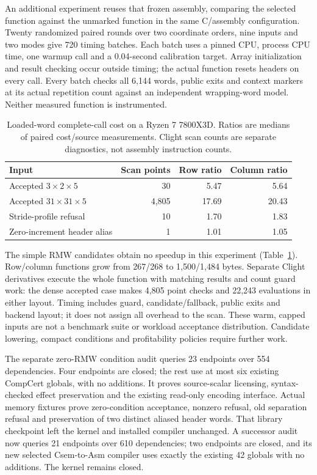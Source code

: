 An additional experiment reuses that frozen assembly, comparing the
selected function against the unmarked function in the same C/assembly
configuration. Twenty randomized paired rounds over two coordinate orders,
nine inputs and two modes give 720 timing batches. Each batch uses a pinned
CPU, process CPU time, one warmup call and a 0.04-second calibration target.
Array initialization and result checking occur outside timing; the actual
function resets headers on every call. Every batch checks all 6,144 words,
public exits and context markers at its actual repetition count against an
independent wrapping-word model. Neither measured function is instrumented.

\begin{table}[t]
\centering
\caption{Loaded-word complete-call cost on a Ryzen 7 7800X3D. Ratios are
medians of paired cost/source measurements. Clight scan counts are separate
diagnostics, not assembly instruction counts.}
\label{tab:loaded-word-cost}
\begin{tabular}{lrrr}
\toprule
Input & Scan points & Row ratio & Column ratio \\
\midrule
Accepted $3\times2\times5$ & 30 & 5.47 & 5.64 \\
Accepted $31\times31\times5$ & 4,805 & 17.69 & 20.43 \\
Stride-profile refusal & 10 & 1.70 & 1.83 \\
Zero-increment header alias & 1 & 1.01 & 1.05 \\
\bottomrule
\end{tabular}
\end{table}

The simple RMW candidates obtain no speedup in this experiment
(Table~\ref{tab:loaded-word-cost}). Row/column functions grow from 267/268
to 1,500/1,484 bytes. Separate Clight derivatives execute the whole function
with matching results and count guard work: the dense accepted case makes
4,805 point checks and 22,243  evaluations in either layout.
Timing includes guard, candidate/fallback, public exits and backend layout;
it does not assign all overhead to the scan. These warm, capped inputs are
not a benchmark suite or workload acceptance distribution. Candidate lowering,
compact conditions and profitability policies require further work.

The separate zero-RMW condition audit queries 23 endpoints over 554
dependencies. Four endpoints are closed; the rest use at most six existing
CompCert globals, with no additions. It proves source-scalar licensing,
syntax-checked effect preservation and the existing read-only encoding
interface. Actual memory fixtures prove zero-condition acceptance, nonzero
refusal, old separation refusal and preservation of two distinct aliased
header words. That library checkpoint left the kernel and installed compiler
unchanged. A successor audit now queries 21 endpoints over 610 dependencies;
two endpoints are closed, and its new selected Csem-to-Asm compiler uses exactly
the existing 42 globals with no additions. The kernel remains closed.

